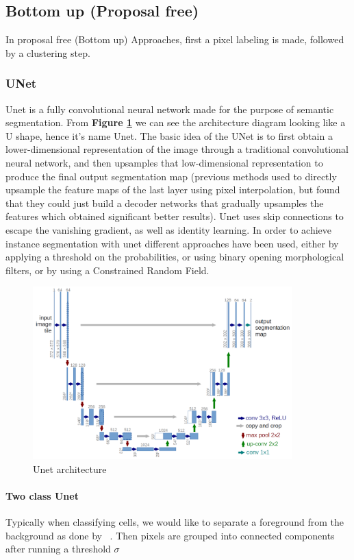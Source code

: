 \documentclass[main.tex]{subfiles}
\begin{document}
\subsection{Bottom up (Proposal free)}
In proposal free (Bottom up) Approaches, first a pixel labeling is made, followed by a clustering step.
\subsubsection{UNet}
Unet is a fully convolutional neural network made for the purpose of semantic segmentation. From \textbf{Figure \ref{fig:unet}} we can see the architecture diagram looking like a U shape, hence it's name Unet. The basic idea of the UNet is to first obtain a lower-dimensional representation of the image through a traditional convolutional neural network, and then upsamples that low-dimensional representation to produce the final output segmentation map (previous methods used to directly upsample the feature maps of the last layer using pixel interpolation, but found that they could just build a decoder networks that gradually upsamples the features which obtained significant better results). Unet uses skip connections to escape the vanishing gradient, as well as identity learning. In order to achieve instance segmentation with unet different approaches have been used, either by applying a threshold on the probabilities, or using binary opening morphological filters, or by using a Constrained Random Field.

\begin{figure}
    \centering
    \includegraphics[width=10cm]{images/unet.png}
    \caption{Unet architecture}
    \label{fig:unet}
\end{figure}

\paragraph{Two class Unet} Typically when classifying cells, we would like to separate a foreground from the background as done by ~\cite{Ronneberger2015}. Then pixels are grouped into connected components after running a threshold $\sigma$ 
\end{document}
